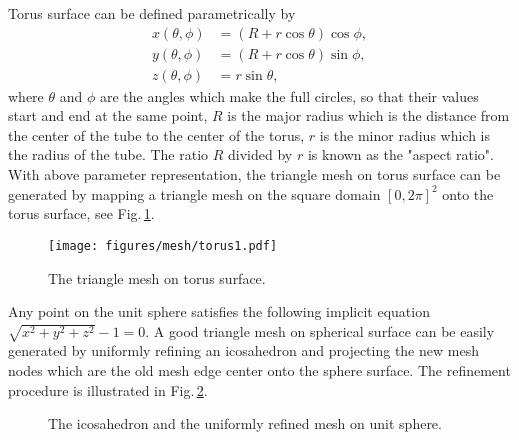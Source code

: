 \documentclass[final,1p,times]{elsarticle}
\begin{document}
Torus surface can be defined parametrically by
\begin{align*}
    x(\theta, \phi) &= (R + r\cos\theta)\cos\phi,\\
    y(\theta, \phi) &= (R + r\cos\theta)\sin\phi,\\
    z(\theta, \phi) &= r\sin\theta,
\end{align*}
where $\theta$ and $\phi$ are the angles which make the full circles, so that
their values start and end at the same point, $R$ is the major radius which is
the distance from the center of the tube to the center of the torus, $r$ is the
minor radius which is the radius of the tube. The ratio $R$ divided by $r$ is
known as the "aspect ratio". With above parameter representation,  the triangle
mesh on torus surface can be generated by mapping a triangle mesh on the square
domain $[0, 2\pi]^2$ onto the torus surface, see Fig.\,\ref{fig:mesh-torus}. 
\begin{figure}[H]
    \setlength{\captionmargin}{2pt}
    \centering
    \texttt{[image: figures/mesh/torus1.pdf]}
    \caption{The triangle mesh on torus surface.}
    \label{fig:mesh-torus}
\end{figure}

Any point on the unit sphere
satisfies the following implicit equation
$ \sqrt{x^2 + y^2 + z^2} - 1 = 0$.
A good triangle mesh on spherical surface can be easily
generated by uniformly refining an icosahedron and projecting the new mesh
nodes which are the old mesh edge center onto the sphere surface. 
The refinement procedure is illustrated in
Fig.\,\ref{fig:mesh-sphere}. 

\begin{figure}[H]
    \setlength{\captionmargin}{2pt}
    \centering
    \hspace{0.5cm}
    \hspace{0.5cm}
    \hspace{0.5cm}
    \caption{The icosahedron and the uniformly refined mesh on unit sphere.}
    \label{fig:mesh-sphere}
\end{figure}
\end{document}
